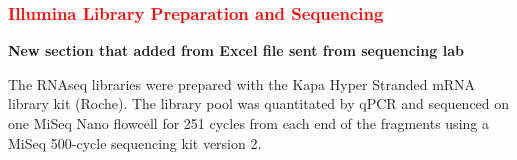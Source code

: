 \subsubsection{\textcolor{red}{Illumina Library Preparation and Sequencing}}

\textbf{New section that added from Excel file sent from sequencing lab}

The RNAseq libraries were prepared with the Kapa Hyper Stranded mRNA library kit (Roche). The library pool was quantitated by qPCR and sequenced on one MiSeq Nano flowcell for 251 cycles from each end of the fragments using a MiSeq 500-cycle sequencing kit version 2.


